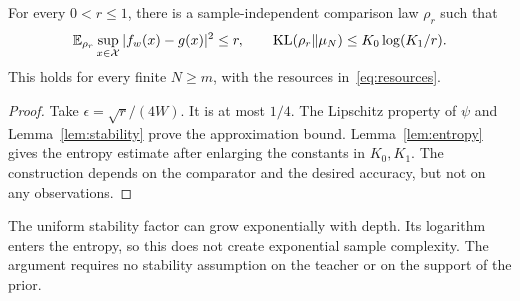 \begin{lemma}\label{lem:comparison}
For every $0<r\le1$, there is a sample-independent comparison law $\rho_r$ such that
\[
 \mathbb E_{\rho_r}\sup_{x\in\mathcal X}|f_w(x)-g(x)|^2\le r,
 \qquad \operatorname{KL}(\rho_r\|\mu_N)\le K_0\log(K_1/r).
\]
This holds for every finite $N\ge m$, with the resources in~\eqref{eq:resources}.
\end{lemma}
\begin{proof}
Take $\epsilon=\sqrt r/(4W)$. It is at most $1/4$. The Lipschitz property of $\psi$ and Lemma~\ref{lem:stability} prove the approximation bound. Lemma~\ref{lem:entropy} gives the entropy estimate after enlarging the constants in $K_0,K_1$. The construction depends on the comparator and the desired accuracy, but not on any observations.
\end{proof}

The uniform stability factor can grow exponentially with depth. Its logarithm enters the entropy, so this does not create exponential sample complexity. The argument requires no stability assumption on the teacher or on the support of the prior.
